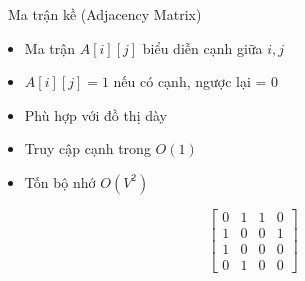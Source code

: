 \documentclass{beamer}
\begin{document}
\begin{frame}{\faTable\ Ma trận kề (Adjacency Matrix)}
\begin{tcolorbox}
\begin{itemize}
\item Ma trận $A[i][j]$ biểu diễn cạnh giữa $i, j$
\item $A[i][j] = 1$ nếu có cạnh, ngược lại = 0
\item Phù hợp với đồ thị dày
\item Truy cập cạnh trong $O(1)$
\item Tốn bộ nhớ $O(V^2)$
\end{itemize}
\end{tcolorbox}

\[
\begin{bmatrix}
0 & 1 & 1 & 0 \\
1 & 0 & 0 & 1 \\
1 & 0 & 0 & 0 \\
0 & 1 & 0 & 0
\end{bmatrix}
\]
\end{frame}
\end{document}
